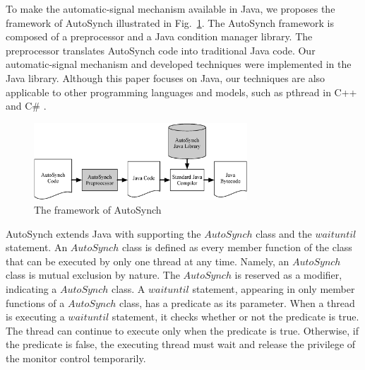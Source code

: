 \documentclass[preprint]{sigplanconf}
\begin{document}
To make the automatic-signal mechanism available in Java, we proposes the 
framework of AutoSynch illustrated in Fig.~\ref{fig:fw}. 
The AutoSynch framework is composed of a 
preprocessor and a Java condition manager library. The preprocessor translates 
AutoSynch code into traditional Java code. Our automatic-signal mechanism and 
developed techniques were implemented in the Java library. Although this paper 
focuses on Java, our techniques are also applicable to other programming 
languages and models, such as pthread in C++ and C\# \cite{hwg03}.

%
\begin{figure}[ht!]
  \centering
  \includegraphics[width=80mm]{fig/flow.eps}
  \caption{The framework of AutoSynch}
  \label{fig:fw}
\end{figure}


AutoSynch extends Java with supporting the $AutoSynch$ class and the
$waituntil$ 
statement. An $AutoSynch$ class is defined as every member function of the class 
that can be executed by only one thread at any time. Namely, an $AutoSynch$ class is
mutual exclusion by nature. The $AutoSynch$ is reserved as a modifier, 
indicating a $AutoSynch$ class. A $waituntil$ statement, appearing in 
only member functions of a $AutoSynch$ class, has a predicate as its parameter. 
When a thread is executing a $waituntil$ statement, it checks whether or not the 
predicate is true. The thread can continue to execute only when the predicate
is true. Otherwise, if the predicate is false, the executing thread must wait 
and release the privilege of the monitor control temporarily. 
\end{document}
